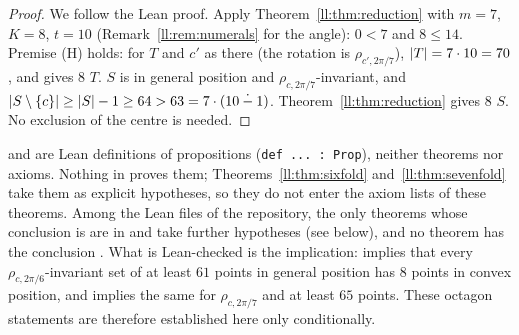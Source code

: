 \begin{proof}
We follow the Lean proof. Apply Theorem~\ref{ll:thm:reduction} with $m=7$, $K=8$, $t=10$ (Remark~\ref{ll:rem:numerals}
for the angle): $0<7$ and $8\le14$. Premise (H) holds: for $T$ and $c'$ as there (the rotation is
$\rho_{c',2\pi/7}$), $\lvert T\rvert=7\cdot10=70$, and
 gives  $8$ $T$. $S$ is in general position and $\rho_{c,2\pi/7}$-invariant, and
$\lvert S\setminus\{c\}\rvert\ge\lvert S\rvert-1\ge64>63=7\cdot(10\mathbin{\dot{-}}1)$. Theorem~\ref{ll:thm:reduction} gives
 $8$ $S$. No exclusion of the centre is needed.
\end{proof}

\begin{remark}\label{ll:rem:hyp}
 and  are Lean definitions of propositions (\texttt{def ... : Prop}), neither theorems
nor axioms. Nothing in  proves them; Theorems~\ref{ll:thm:sixfold}
and~\ref{ll:thm:sevenfold} take them as explicit hypotheses, so they do not enter the axiom lists of these theorems.
Among the Lean files of the repository, the only theorems whose conclusion is  are in
 and take further hypotheses (see below), and no theorem has the conclusion
. What is Lean-checked is the implication:  implies that every
$\rho_{c,2\pi/6}$-invariant set of at least $61$ points in general position has $8$ points in convex position, and
 implies the same for $\rho_{c,2\pi/7}$ and at least $65$ points. These octagon statements are
therefore established here only conditionally.


\end{remark}
